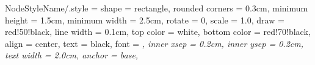 
\tikzset
{
	NodeStyleName/.style =
	{
		shape			= rectangle,			%
		rounded corners	= 0.3cm,				%
		minimum height	= 1.5cm,				%
		minimum width	= 2.5cm,				%
		rotate			= 0,					%
		scale			= 1.0,					%
		draw			= red!50!black,			%
		line width		= 0.1cm,				%
		top color		= white,				%
		bottom color	= red!70!black,			%
		align			= center,				%
		text			= black,				%
		font			= \scriptsize\itshape,	%
		inner xsep		= 0.2cm,				%
		inner ysep		= 0.2cm,				%
		text width		= 2.0cm,				%
		anchor			= base,					%
	}
}

